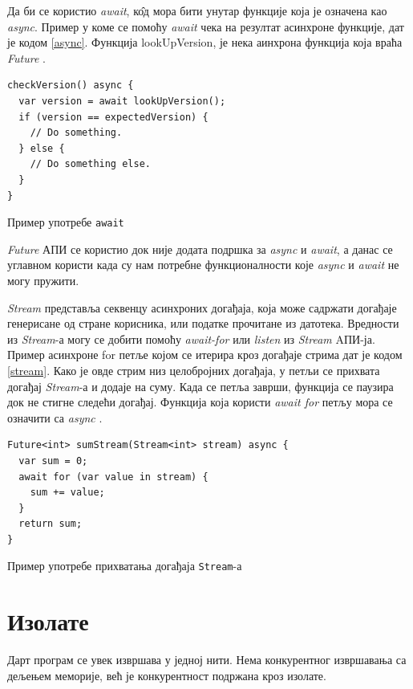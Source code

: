 \documentclass[12pt,oneside]{memoir}
\begin{document}
Да би се користио \textit{await}, к\^{о}д мора бити унутар функције која је означена као \textit{async}. Пример у коме се помоћу \textit{await} чека на резултат асинхроне функције, дат је кодом \ref{async}. Функција lookUpVersion, је нека аинхрона функција која враћа \textit{Future} \cite{dart, dart1}.

\begin{listing}
\begin{verbatim}
checkVersion() async {
  var version = await lookUpVersion();
  if (version == expectedVersion) {
    // Do something.
  } else {
    // Do something else.
  }
}
\end{verbatim}
\caption{Пример употребе \texttt{await}}
\label{async}
\end{listing}

\textit{Future} АПИ се користио док није додата подршка за \textit{async} и \textit{await}, а данас се углавном користи када су нам потребне функционалности које \textit{async} и \textit{await} не могу пружити.

\textit{Stream} представља секвенцу асинхроних догађаја, која може садржати догађаје генерисане од стране корисника, или податке прочитане из датотека.  Вредности из \textit{Stream}-а могу се добити помоћу \textit{await-for} или \textit{listen} из \textit{Stream} AПИ-ја. Пример асинхроне for петље којом се итерира кроз догађаје стрима дат је кодом \ref{stream}. Како је овде стрим низ целобројних догађаја, у петљи се прихвата догађај \textit{Stream}-а и додаје на суму. Када се петља заврши, функција се паузира док не стигне следећи догађај. Функција која користи \textit{await for} петљу мора се означити са \textit{async} \cite{dart, dart1}.

\begin{listing}
\begin{verbatim}
Future<int> sumStream(Stream<int> stream) async {
  var sum = 0;
  await for (var value in stream) {
    sum += value;
  }
  return sum;
}
\end{verbatim}
\caption{Пример употребе прихватања догађаја \texttt{Stream}-а}
\label{stream}
\end{listing}
\section{Изолате}
\label{dart_izolate}
Дарт програм се увек извршава у једној нити. Нема конкурентног извршавања са дељењем меморије, већ је конкурентност подржана кроз изолате.
\end{document}
